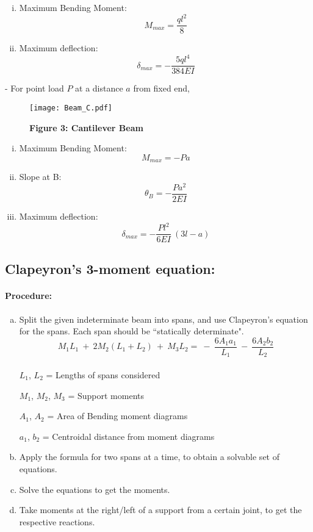 \documentclass{article}
\begin{document}
{\begin{figure}
\end{figure}
\begin{enumerate}[(i)]
\item Maximum Bending Moment: {\LARGE $$M_{max}=\frac{ql^2}{8}$$}
\item Maximum deflection:
{\LARGE $$\delta_{max}=-\frac{5ql^4}{384EI}{}$$}
\end{enumerate}
-\newpage
{\LARGE For point load $P$ at a distance $a$ from fixed end,}
\begin{figure}
\caption*{\Large \textbf{Figure 3: Cantilever Beam}}
\hbox{\hspace{-2.2cm}\texttt{[image: Beam\_C.pdf]}}
\end{figure}
\begin{enumerate}[(i)]
\item Maximum Bending Moment: {\LARGE $$M_{max}=-Pa$$}
\item Slope at B: {\LARGE $$\theta_B=-\frac{Pa^2}{2EI}$$}
\item Maximum deflection:
{\LARGE $$\delta_{max}=-\frac{Pl^2}{6EI}\ (3l-a)$$}
\end{enumerate}
\newpage
\subsection{\LARGE Clapeyron's 3-moment equation:}
\paragraph{\Large Procedure:}
\begin{enumerate}[(a)]
\item Split the given indeterminate beam into spans, and use Clapeyron's equation for the spans. Each span should be ``statically determinate".
{\LARGE $$M_1L_1\ +\ 2M_2(L_1+L_2)\ +\ M_3L_2=\ -\ \frac{6A_1a_1}{L_1}\ -\ \frac{6A_2b_2}{L_2}$$}
\\
{\LARGE $L_1$, $L_2$} = Lengths of spans considered

{\LARGE $M_1$, $M_2$, $M_3$} = Support moments

{\LARGE $A_1$, $A_2$} = Area of Bending moment diagrams

{\LARGE $a_1$, $b_2$} = Centroidal distance from moment diagrams
\\
\item Apply the formula for two spans at a time, to obtain a solvable set of equations.
\item Solve the equations to get the moments.
\item Take moments at the right/left of a support from a certain joint, to get the respective reactions.
\end{enumerate}
}
\end{document}
